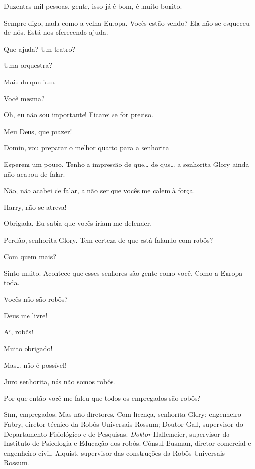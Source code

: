  Duzentas mil pessoas, gente, isso já é
bom, é muito bonito.

 Sempre digo, nada como a velha Europa. Vocês estão vendo? Ela não
se esqueceu de nós. Está nos oferecendo ajuda.

 Que ajuda? Um teatro?

 Uma orquestra?

 Mais do que isso.

 Você mesma?

 Oh, eu não sou importante! Ficarei se for preciso.

 Meu Deus, que prazer!

 Domin, vou preparar o melhor quarto para a senhorita.

 Esperem um pouco. Tenho a impressão de que\ldots{} de que\ldots{} a senhorita Glory ainda
não acabou de falar.

 Não, não acabei de falar, a não ser que vocês me calem à força.


 Harry, não se atreva!

 Obrigada. Eu sabia que vocês iriam me defender.

 Perdão, senhorita Glory. Tem certeza de que está falando com robôs?

  Com quem mais?

 Sinto muito. Acontece que esses senhores são gente como você. Como a
Europa toda.

  Vocês não são robôs?

  Deus me livre!

 Ai, robôs!

  Muito obrigado!

 Mas\ldots{} não é possível!

 Juro senhorita, nós não somos robôs.

  Por que então você me falou que todos os empregados são robôs?

 Sim, empregados. Mas não diretores. Com licença, senhorita Glory:
engenheiro Fabry, diretor técnico da Robôs Universais Rossum;
 Doutor Gall, supervisor do Departamento Fisiológico e de Pesquisas.
\textit{Doktor} Hallemeier, supervisor do Instituto de Psicologia e Educação dos
 robôs. Cônsul Busman, diretor comercial e engenheiro civil, 
 Alquist, supervisor das construções da Robôs Universais Rossum.

